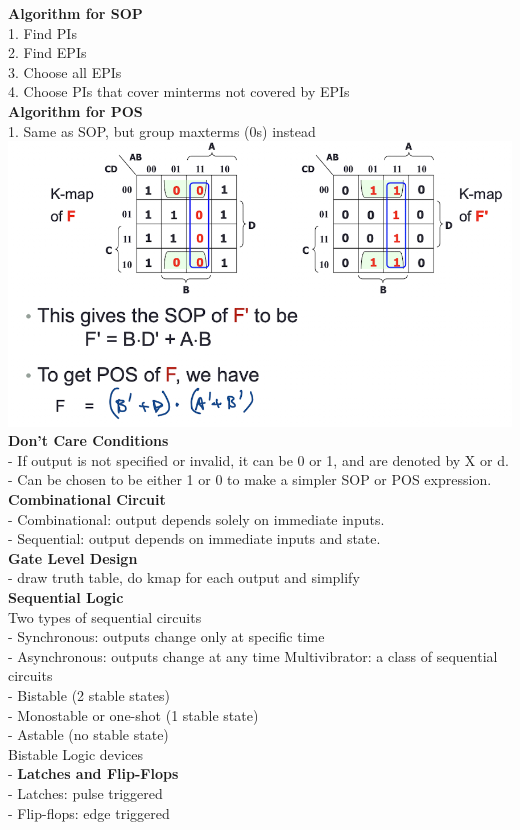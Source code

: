 \documentclass[10pt, a4paper]{article}
\begin{document}
\begin{multicols*}{3}
		\textbf{Algorithm for SOP}\\
		1. Find PIs\\
		2. Find EPIs\\
		3. Choose all EPIs\\
		4. Choose PIs that cover minterms not covered by EPIs\\
		
		\textbf{Algorithm for POS}\\
		1. Same as SOP, but group maxterms (0s) instead
		\includegraphics[scale=.5]{./assets/POSKmap}\\
		
		\textbf{Don't Care Conditions}\\
		- If output is not specified or invalid, it can be 0 or 1, and are denoted by X or d.\\
		- Can be chosen to be either 1 or 0 to make a simpler SOP or POS expression.\\
		
		{\normalsize\textbf{Combinational Circuit}}\\
		- Combinational: output depends solely on immediate inputs.\\
		- Sequential: output depends on immediate inputs and state.\\
		
		\textbf{Gate Level Design}\\
		- draw truth table, do kmap for each output and simplify\\
		
		{\normalsize\textbf{Sequential Logic}}\\
		Two types of sequential circuits\\
		- Synchronous: outputs change only at specific time\\
		- Asynchronous: outputs change at any time
		Multivibrator: a class of sequential circuits\\
		- Bistable (2 stable states)\\
		- Monostable or one-shot (1 stable state)\\
		- Astable (no stable state)\\
		Bistable Logic devices\\
		- \textbf{Latches and Flip-Flops}\\
		- Latches: pulse triggered\\
		- Flip-flops: edge triggered\\
		

\end{multicols*}
\end{document}
